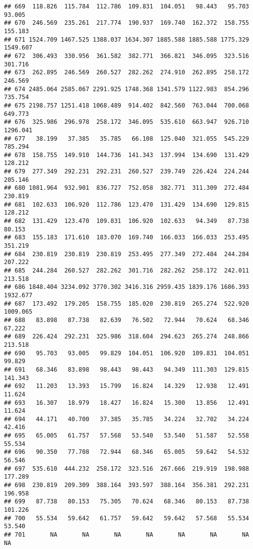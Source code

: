 \documentclass[
]{article}
\begin{document}
\begin{verbatim}
## 669  118.826  115.784  112.786  109.831  104.051   98.443   95.703   93.005
## 670  246.569  235.261  217.774  190.937  169.740  162.372  158.755  155.183
## 671 1524.709 1467.525 1388.037 1634.307 1885.588 1885.588 1775.329 1549.607
## 672  306.493  330.956  361.582  382.771  366.821  346.095  323.516  301.716
## 673  262.895  246.569  260.527  282.262  274.910  262.895  258.172  246.569
## 674 2485.064 2585.067 2291.925 1748.368 1341.579 1122.983  854.296  735.754
## 675 2198.757 1251.418 1068.489  914.402  842.560  763.044  700.068  649.773
## 676  325.986  296.978  258.172  346.095  535.610  663.947  926.710 1296.041
## 677   38.199   37.385   35.785   66.108  125.040  321.055  545.229  785.294
## 678  158.755  149.910  144.736  141.343  137.994  134.690  131.429  128.212
## 679  277.349  292.231  292.231  260.527  239.749  226.424  224.244  205.146
## 680 1081.964  932.901  836.727  752.058  382.771  311.309  272.484  230.819
## 681  102.633  106.920  112.786  123.470  131.429  134.690  129.815  128.212
## 682  131.429  123.470  109.831  106.920  102.633   94.349   87.738   80.153
## 683  155.183  171.610  183.070  169.740  166.033  166.033  253.495  351.219
## 684  230.819  230.819  230.819  253.495  277.349  272.484  244.284  207.222
## 685  244.284  260.527  282.262  301.716  282.262  258.172  242.011  213.518
## 686 1848.404 3234.092 3770.302 3416.316 2959.435 1839.176 1686.393 1932.677
## 687  173.492  179.205  158.755  185.020  230.819  265.274  522.920 1009.065
## 688   83.898   87.738   82.639   76.502   72.944   70.624   68.346   67.222
## 689  226.424  292.231  325.986  318.604  294.623  265.274  248.866  213.518
## 690   95.703   93.005   99.829  104.051  106.920  109.831  104.051   99.829
## 691   68.346   83.898   98.443   98.443   94.349  111.303  129.815  141.343
## 692   11.203   13.393   15.799   16.824   14.329   12.938   12.491   11.624
## 693   16.307   18.979   18.427   16.824   15.300   13.856   12.491   11.624
## 694   44.171   40.700   37.385   35.785   34.224   32.702   34.224   42.416
## 695   65.005   61.757   57.568   53.540   53.540   51.587   52.558   55.534
## 696   90.350   77.708   72.944   68.346   65.005   59.642   54.532   56.546
## 697  535.610  444.232  258.172  323.516  267.666  219.919  198.988  177.289
## 698  230.819  209.309  388.164  393.597  388.164  356.381  292.231  196.958
## 699   87.738   80.153   75.305   70.624   68.346   80.153   87.738  101.226
## 700   55.534   59.642   61.757   59.642   59.642   57.568   55.534   53.540
## 701       NA       NA       NA       NA       NA       NA       NA       NA

\end{verbatim}
\end{document}
